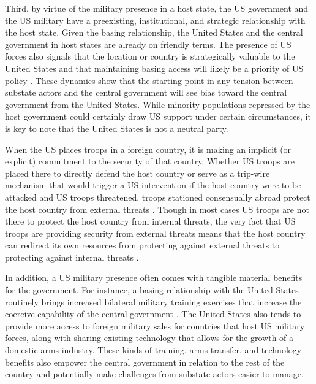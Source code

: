 Third, by virtue of the military presence in a host state, the US government and the US military have a preexisting, institutional, and strategic relationship with the host state. Given the basing relationship, the United States and the central government in host states are already on friendly terms. The presence of US forces also signals that the location or country is strategically valuable to the United States and that maintaining basing access will likely be a priority of US policy \cite{StraversElKurd2018}. These dynamics show that the starting point in any tension between substate actors and the central government will see bias toward the central government from the United States. While minority populations repressed by the host government could certainly draw US support under certain circumstances, it is key to note that the United States is not a neutral party. 

When the US places troops in a foreign country, it is making an implicit (or explicit) commitment to the security of that country. Whether US troops are placed there to directly defend the host country or serve as a trip-wire mechanism that would trigger a US intervention if the host country were to be attacked and US troops threatened, troops stationed consensually abroad protect the host country from external threats \cite{Schelling1966}.  Though in most cases US troops are not there to protect the host country from internal threats, the very fact that US troops are providing security from external threats means that the host country can redirect its own resources from protecting against external threats to protecting against internal threats \cite{machainandmorgan2013,allenetal2016,allenetal2017}.

In addition, a US military presence often comes with tangible material benefits for the government. For instance, a basing relationship with the United States routinely brings increased bilateral military training exercises that increase the coercive capability of the central government \cite{Ruby2010}. The United States also tends to provide more access to foreign military sales for countries that host US military forces, along with sharing existing technology that allows for the growth of a domestic arms industry. These kinds of training, arms transfer, and technology benefits also empower the central government in relation to the rest of the country and potentially make challenges from substate actors easier to manage. 

